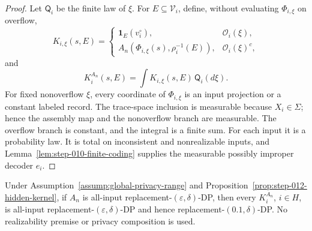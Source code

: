 \begin{proof}
Let \(\mathsf Q_i\) be the finite law of \(\xi\).  For
\(E\subseteq\mathcal V_i\), define, without evaluating
\(\Phi_{i,\xi}\) on overflow,
\begin{equation}\label{eq:step-012-conditional-kernel}
K_{i,\xi}(s,E)=
\begin{cases}
\mathbf1_E(v_i^\circ),&\mathcal O_i(\xi),\\
A_n(\Phi_{i,\xi}(s),\rho_i^{-1}(E)),&\mathcal O_i(\xi)^c,
\end{cases}
\end{equation}
and
\begin{equation}\label{eq:step-012-kernel-mixture}
K_i^{A_n}(s,E)=\int K_{i,\xi}(s,E)\,\mathsf Q_i(d\xi).
\end{equation}
For fixed nonoverflow \(\xi\), every coordinate of \(\Phi_{i,\xi}\) is
an input projection or a constant labeled record.  The trace-space
inclusion is measurable because \(X_i\in\Sigma\); hence the assembly map
and the nonoverflow branch are measurable.  The overflow branch is
constant, and the integral is a finite sum.  For each input it is a
probability law.  It is total on inconsistent and nonrealizable inputs,
and Lemma~\ref{lem:step-010-finite-coding} supplies the measurable
possibly improper decoder \(e_i\).
\end{proof}

\begin{proposition}
\label{prop:step-012-hidden-privacy}
Under Assumption~\ref{assump:global-privacy-range} and
Proposition~\ref{prop:step-012-hidden-kernel}, if \(A_n\) is all-input
replacement-\((\varepsilon,\delta)\)-DP, then every \(K_i^{A_n}\),
\(i\in H\), is all-input replacement-\((\varepsilon,\delta)\)-DP and
hence replacement-\((0.1,\delta)\)-DP.  No realizability premise or
privacy composition is used.
\end{proposition}

